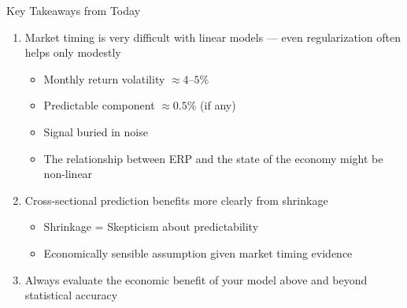\documentclass[10pt]{beamer}
\begin{document}
\begin{frame}{Key Takeaways from Today}
  \begin{enumerate}
    \item Market timing is very difficult with linear models --- even regularization often helps only modestly
    \begin{itemize}
    \item Monthly return volatility $\approx 4$--$5\%$
    \item Predictable component $\approx 0.5\%$ (if any)
    \item Signal buried in noise
\item The relationship between ERP and the state of the economy might be non-linear
    \end{itemize}
    \vspace{0.3em}
    \item Cross-sectional prediction benefits more clearly from shrinkage
  \begin{itemize}
  \item Shrinkage = Skepticism about predictability 
  \item Economically sensible assumption given market timing evidence
  \end{itemize}
    \vspace{0.3em}
    \item Always evaluate the economic benefit of your model above and beyond statistical accuracy
 \end{enumerate}
\end{frame}
\end{document}
